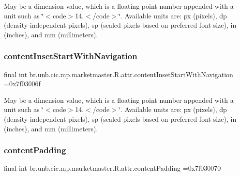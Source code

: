 May be a dimension value, which is a floating point number appended with a unit such as \char`\"{}$<$code$>$14.\+5sp$<$/code$>$\char`\"{}. Available units are\+: px (pixels), dp (density-\/independent pixels), sp (scaled pixels based on preferred font size), in (inches), and mm (millimeters). \mbox{\label{classbr_1_1unb_1_1cic_1_1mp_1_1marketmaster_1_1R_1_1attr_acd2fbc71444e1fe740afd7085955598b}} 
\subsubsection{\texorpdfstring{content\+Inset\+Start\+With\+Navigation}{contentInsetStartWithNavigation}}
{\footnotesize\ttfamily final int br.\+unb.\+cic.\+mp.\+marketmaster.\+R.\+attr.\+content\+Inset\+Start\+With\+Navigation =0x7f03006f\hspace{0.3cm}{\ttfamily [static]}}

May be a dimension value, which is a floating point number appended with a unit such as \char`\"{}$<$code$>$14.\+5sp$<$/code$>$\char`\"{}. Available units are\+: px (pixels), dp (density-\/independent pixels), sp (scaled pixels based on preferred font size), in (inches), and mm (millimeters). \mbox{\label{classbr_1_1unb_1_1cic_1_1mp_1_1marketmaster_1_1R_1_1attr_a0c3c7e2765b71318204b3a1c817afcc4}} 
\subsubsection{\texorpdfstring{content\+Padding}{contentPadding}}
{\footnotesize\ttfamily final int br.\+unb.\+cic.\+mp.\+marketmaster.\+R.\+attr.\+content\+Padding =0x7f030070\hspace{0.3cm}{\ttfamily [static]}}

